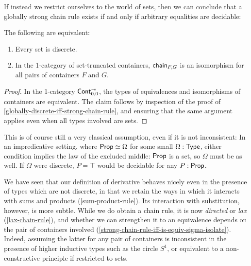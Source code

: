 If instead we restrict ourselves to the world of sets,
then we can conclude that a globally strong chain rule exists if and only if arbitrary equalities are decidable:
\begin{corollary}
  The following are equivalent:
  \begin{enumerate}
    \item Every set is discrete.
    \item In the 1-category of set-truncated containers, \( \operatorname{\mathsf{chain}}_{F,G} \) is an isomorphism
      for all pairs of containers \( F \) and \( G \).
  \end{enumerate}
  \begin{proof}
    In the 1-category \( \operatorname{\operatorname{\mathsf{Cont}}}^{{\scriptscriptstyle\multimap}}_{0,0} \), the types of equivalences and isomorphisms of containers are equivalent.
    The claim follows by inspection of the proof of \autoref{globally-discrete-iff-strong-chain-rule},
    and ensuring that the same argument applies even when all types involved are sets.
  \end{proof}
\end{corollary}
This is of course still a very classical assumption, even if it is not inconsistent:
In an impredicative setting, where \( \operatorname{\mathsf{Prop}} \simeq \Omega \) for some small \( \Omega : \operatorname{\mathsf{Type}} \),
either condition implies the law of the excluded middle:
\( \operatorname{\mathsf{Prop}} \) is a set, so \( \Omega \) must be as well.
If \( \Omega \) were discrete, \( P = \top \) would be decidable for any \( P : \operatorname{\mathsf{Prop}} \).

We have seen that our definition of derivative behaves nicely even in the presence of types which are not discrete,
in that we retain the ways in which it interacts with sums and products (\autoref{sum-product-rule}).
Its interaction with substitution, however, is more subtle.
While we do obtain a chain rule, it is now \emph{directed} or \emph{lax} (\autoref{lax-chain-rule}),
and whether we can strengthen it to an equivalence depends on the pair of containers involved (\autoref{strong-chain-rule-iff-is-equiv-sigma-isolate}).
Indeed, assuming the latter for any pair of containers is inconsistent in the presence of higher inductive types such as the circle \( S^1 \),
or equivalent to a non-constructive principle if restricted to sets.
